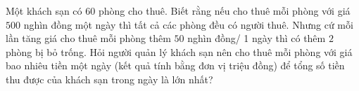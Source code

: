 \begin{bt}%
	Một khách sạn có $60$ phòng cho thuê. Biết rằng nếu cho thuê mỗi phòng với giá $500$ nghìn đồng một ngày thì tất cả các phòng đều có người thuê. Nhưng cứ mỗi lần tăng giá cho thuê mỗi phòng thêm $50$ nghìn đồng/ 1 ngày thì có thêm $2$ phòng bị bỏ trống. Hỏi người quản lý khách sạn nên cho thuê mỗi phòng với giá bao nhiêu tiền một ngày (kết quả tính bằng đơn vị triệu đồng) để tổng số tiền thu được của khách sạn trong ngày là lớn nhất?
\end{bt}


